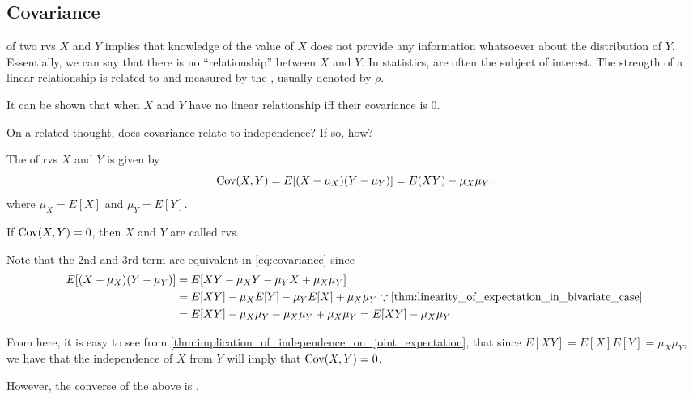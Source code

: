 \documentclass[notoc,notitlepage]{tufte-book}
\begin{document}
\subsection{Covariance}%
\label{sub:covariance}

 of two rvs $X$ and $Y$ implies that knowledge of the value of $X$ does not provide any information whatsoever about the distribution of $Y$. Essentially, we can say that there is no ``relationship'' between $X$ and $Y$. In statistics,  are often the subject of interest. The strength of a linear relationship is related to  and measured by the , usually denoted by $\rho$.

It can be shown that when $X$ and $Y$ have no linear relationship iff their covariance is $0$.

On a related thought, does covariance relate to independence? If so, how?

\begin{defn}[Covariance]
\label{defn:covariance}
  The  of rvs $X$ and $Y$ is given by
  \begin{equation}\label{eq:covariance}
    \operatorname{Cov}( X, Y ) = E[ (X - \mu_X) (Y - \mu_Y) ] = E(XY) - \mu_X \mu_Y.
  \end{equation}
  where $\mu_X = E[X]$ and $\mu_Y = E[Y]$.

  If $\operatorname{Cov}(X, Y) = 0$, then $X$ and $Y$ are called  rvs.
\end{defn}

\begin{note}
  Note that the 2nd and 3rd term are equivalent in \cref{eq:covariance} since
  \begin{align*}
    E[ (X - \mu_X) (Y - \mu_Y) ]
      &= E[ XY - \mu_X Y - \mu_Y X + \mu_X \mu_Y ] \\
      &= E[ XY ] - \mu_X E[Y] - \mu_Y E[X] + \mu_X \mu_Y \because \cref{thm:linearity_of_expectation_in_bivariate_case} \\
      &= E[ XY ] - \mu_X \mu_Y - \mu_X \mu_Y + \mu_X \mu_Y = E[ XY ] - \mu_X \mu_Y
  \end{align*}

  From here, it is easy to see from \cref{thm:implication_of_independence_on_joint_expectation}, that since $E[XY] = E[X] E[Y] = \mu_X \mu_Y$, we have that the independence of $X$ from $Y$ will imply that $\operatorname{Cov}(X, Y) = 0$.

  However, the converse of the above is .
\end{note}
\end{document}
